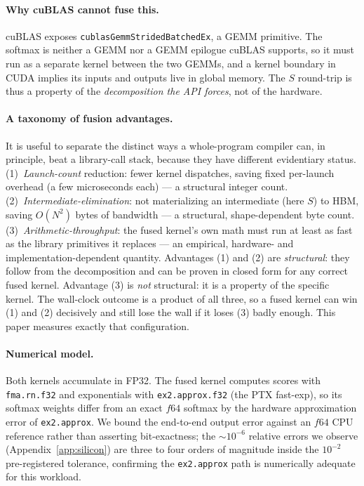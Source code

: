 \documentclass[11pt,a4paper]{article}
\newcommand{\verdict}[1]{\texttt{#1}}
\begin{document}
\paragraph{Why cuBLAS cannot fuse this.}
cuBLAS exposes \verdict{cublasGemmStridedBatchedEx}, a GEMM primitive. The
softmax is neither a GEMM nor a GEMM epilogue cuBLAS supports, so it must run as
a separate kernel between the two GEMMs, and a kernel boundary in CUDA implies
its inputs and outputs live in global memory. The $S$ round-trip is thus a
property of the \emph{decomposition the API forces}, not of the hardware.

\paragraph{A taxonomy of fusion advantages.}
It is useful to separate the distinct ways a whole-program compiler can, in
principle, beat a library-call stack, because they have different evidentiary
status. (1)~\emph{Launch-count} reduction: fewer kernel dispatches, saving
fixed per-launch overhead (a few microseconds each) --- a structural integer
count. (2)~\emph{Intermediate-elimination}: not materializing an intermediate
(here $S$) to HBM, saving $O(N^2)$ bytes of bandwidth --- a structural,
shape-dependent byte count. (3)~\emph{Arithmetic-throughput}: the fused kernel's
own math must run at least as fast as the library primitives it replaces --- an
empirical, hardware- and implementation-dependent quantity. Advantages (1) and
(2) are \emph{structural}: they follow from the decomposition and can be proven
in closed form for any correct fused kernel. Advantage (3) is \emph{not}
structural: it is a property of the specific kernel. The wall-clock outcome is a
product of all three, so a fused kernel can win (1) and (2) decisively and still
lose the wall if it loses (3) badly enough. This paper measures exactly that
configuration.

\paragraph{Numerical model.}
Both kernels accumulate in FP32. The fused kernel computes scores with
\verdict{fma.rn.f32} and exponentials with \verdict{ex2.approx.f32} (the PTX
fast-exp), so its softmax weights differ from an exact $f64$ softmax by the
hardware approximation error of \verdict{ex2.approx}. We bound the end-to-end
output error against an $f64$ CPU reference rather than asserting bit-exactness;
the $\sim 10^{-6}$ relative errors we observe (Appendix~\ref{app:silicon}) are
three to four orders of magnitude inside the $10^{-2}$ pre-registered tolerance,
confirming the \verdict{ex2.approx} path is numerically adequate for this
workload.
\end{document}
